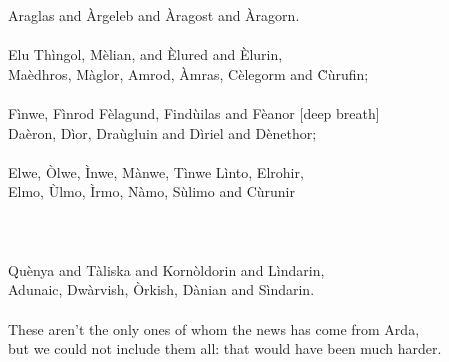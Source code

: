\begin{multicols}{2}
Araglas and \` Argeleb and \` Aragost and \` Aragorn. \`
\\
\\
Elu Th\`ingol, M\`elian, and \` Elured and \` Elurin, \`
\\
Ma\`edhros, M\`aglor, Amrod, \` Amras, C\`elegorm and \`C\`urufin;
\\
\\
F\`inwe, F\`inrod F\`elagund, Find\`uilas and F\`eanor [deep breath]
\\
Da\`eron, D\`ior, Dra\`ugluin and D\`iriel and D\`enethor;
\\
\\
Elwe, \` Olwe, \`Inwe, M\`anwe, T\`inwe L\`into, Elrohir, 
\\
Elmo, \` Ulmo, \` Irmo, N\`amo, S\`ulimo and C\`urunir
\\
\\
\\
\\
Qu\`enya and T\`aliska and Korn\`oldorin and L\`indarin,
\\
Adunaic, Dw\`arvish, \` Orkish, D\`anian and S\`indarin. 
\\
\\
These aren’t the only ones of whom the news has come from Arda,
\\but we could not include them all: that would have been much harder.
\end{multicols}